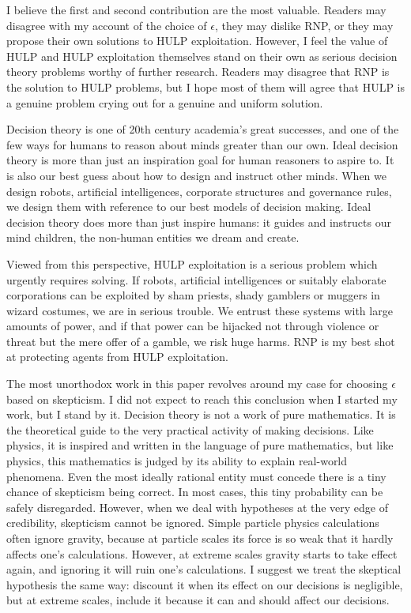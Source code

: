 \documentclass{article}
\begin{document}
I believe the first and second contribution are the most valuable. Readers may disagree with my account of the choice of \(\epsilon\), they may dislike RNP, or they may propose their own solutions to HULP exploitation. However, I feel the value of HULP and HULP exploitation themselves stand on their own as serious decision theory problems worthy of further research. Readers may disagree that RNP is the solution to HULP problems, but I hope most of them will agree that HULP is a genuine problem crying out for a genuine and uniform solution.

Decision theory is one of 20th century academia's great successes, and one of the few ways for humans to reason about minds greater than our own. Ideal decision theory is more than just an inspiration goal for human reasoners to aspire to. It is also our best guess about how to design and instruct other minds. When we design robots, artificial intelligences, corporate structures and governance rules, we design them with reference to our best models of decision making. Ideal decision theory does more than just inspire humans: it guides and instructs our mind children, the non-human entities we dream and create. 

Viewed from this perspective, HULP exploitation is a serious problem which urgently requires solving. If robots, artificial intelligences or suitably elaborate corporations can be exploited by sham priests, shady gamblers or muggers in wizard costumes, we are in serious trouble. We entrust these systems with large amounts of power, and if that power can be hijacked not through violence or threat but the mere offer of a gamble, we risk huge harms. RNP is my best shot at protecting agents from HULP exploitation.

The most unorthodox work in this paper revolves around my case for choosing \(\epsilon\) based on skepticism. I did not expect to reach this conclusion when I started my work, but I stand by it. Decision theory is not a work of pure mathematics. It is the theoretical guide to the very practical activity of making decisions. Like physics, it is inspired and written in the language of pure mathematics, but like physics, this mathematics is judged by its ability to explain real-world phenomena. Even the most ideally rational entity must concede there is a tiny chance of skepticism being correct. In most cases, this tiny probability can be safely disregarded. However, when we deal with hypotheses at the very edge of credibility, skepticism cannot be ignored. Simple particle physics calculations often ignore gravity, because at particle scales its force is so weak that it hardly affects one's calculations. However, at extreme scales gravity starts to take effect again, and ignoring it will ruin one's calculations. I suggest we treat the skeptical hypothesis the same way: discount it when its effect on our decisions is negligible, but at extreme scales, include it because it can and should affect our decisions.
\end{document}
